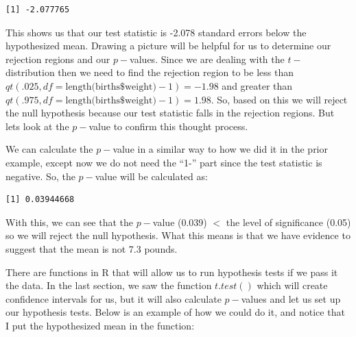 \documentclass[
  letterpaper,
  DIV=11,
  numbers=noendperiod]{scrreprt}
\newenvironment{Shaded}{\begin{snugshade}}{\end{snugshade}}
\newcommand{\AttributeTok}[1]{\textcolor[rgb]{0.40,0.45,0.13}{#1}}
\newcommand{\DecValTok}[1]{\textcolor[rgb]{0.68,0.00,0.00}{#1}}
\newcommand{\FloatTok}[1]{\textcolor[rgb]{0.68,0.00,0.00}{#1}}
\newcommand{\FunctionTok}[1]{\textcolor[rgb]{0.28,0.35,0.67}{#1}}
\newcommand{\NormalTok}[1]{\textcolor[rgb]{0.00,0.23,0.31}{#1}}
\newcommand{\SpecialCharTok}[1]{\textcolor[rgb]{0.37,0.37,0.37}{#1}}
\begin{document}
\begin{verbatim}
[1] -2.077765
\end{verbatim}

This shows us that our test statistic is -2.078 standard errors below
the hypothesized mean. Drawing a picture will be helpful for us to
determine our rejection regions and our \(p-\)values. Since we are
dealing with the \(t-\)distribution then we need to find the rejection
region to be less than
\(qt(.025, df=\text{length(births\$weight)}-1)=-1.98\) and greater than
\(qt(.975, df=\text{length(births\$weight)}-1)=1.98\). So, based on this
we will reject the null hypothesis because our test statistic falls in
the rejection regions. But lets look at the \(p-\)value to confirm this
thought process.

We can calculate the \(p-\)value in a similar way to how we did it in
the prior example, except now we do not need the ``1-'' part since the
test statistic is negative. So, the \(p-\)value will be calculated as:

\begin{Shaded}
\end{Shaded}

\begin{verbatim}
[1] 0.03944668
\end{verbatim}

With this, we can see that the \(p-\)value (0.039) \(<\) the level of
significance (0.05) so we will reject the null hypothesis. What this
means is that we have evidence to suggest that the mean is not 7.3
pounds.

There are functions in R that will allow us to run hypothesis tests if
we pass it the data. In the last section, we saw the function
\(t.test()\) which will create confidence intervals for us, but it will
also calculate \(p-\)values and let us set up our hypothesis tests.
Below is an example of how we could do it, and notice that I put the
hypothesized mean in the function:

\begin{Shaded}
\end{Shaded}
\end{document}
